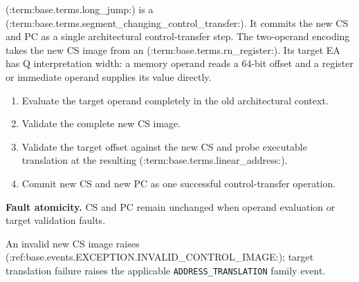 (:term:base.terms.long_jump:) is a (:term:base.terms.segment_changing_control_transfer:). It commits the new CS and PC as a single architectural control-transfer step. The two-operand encoding takes the new CS image from an (:term:base.terms.rn_register:). Its target EA has Q interpretation width: a memory operand reads a 64-bit offset and a register or immediate operand supplies its value directly.

\begin{enumerate}
\item Evaluate the target operand completely in the old architectural context.
\item Validate the complete new CS image.
\item Validate the target offset against the new CS and probe executable translation at the resulting (:term:base.terms.linear_address:).
\item Commit new CS and new PC as one successful control-transfer operation.
\end{enumerate}

\textbf{Fault atomicity.} CS and PC remain unchanged when operand evaluation or target validation faults.

An invalid new CS image raises (:ref:base.events.EXCEPTION.INVALID_CONTROL_IMAGE:); target translation failure raises the applicable
\texttt{ADDRESS\_TRANSLATION} family event.
